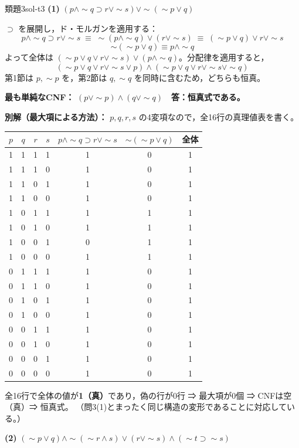 \documentclass[autodetect-engine,dvi=dvipdfmx,ja=standard]{bxjsarticle}
\begin{document}
\begin{solution}{類題3}{sol-t3}
\textbf{(1)} \((p\land\sim q\supset r\lor\sim s)\lor\sim(\sim p\lor q)\)

\(\supset\) を展開し，ド・モルガンを適用する：
\[
  p\land\sim q\supset r\lor\sim s
  \;\equiv\;
  \sim(p\land\sim q)\lor(r\lor\sim s)
  \;\equiv\;
  (\sim p\lor q)\lor r\lor\sim s
\]
\[
  \sim(\sim p\lor q)\equiv p\land\sim q
\]
よって全体は \((\sim p\lor q\lor r\lor\sim s)\lor(p\land\sim q)\)。分配律を適用すると，
\[
  (\sim p\lor q\lor r\lor\sim s\lor p)\land(\sim p\lor q\lor r\lor\sim s\lor\sim q)
\]
第1節は \(p,\sim p\) を，第2節は \(q,\sim q\) を同時に含むため，どちらも恒真。

\textbf{最も単純なCNF：} \((p\lor\sim p)\land(q\lor\sim q)\)　\textbf{答：恒真式である。}

\textbf{別解（最大項による方法）：} \(p,q,r,s\) の4変項なので，全16行の真理値表を書く。

\begin{center}
\scriptsize
\begin{tabular}{cccc|c|c|c}
\toprule
\(p\) & \(q\) & \(r\) & \(s\) & \(p\land\sim q\supset r\lor\sim s\) & \(\sim(\sim p\lor q)\) & 全体 \\
\midrule
1&1&1&1&1&0&1\\
1&1&1&0&1&0&1\\
1&1&0&1&1&0&1\\
1&1&0&0&1&0&1\\
1&0&1&1&1&1&1\\
1&0&1&0&1&1&1\\
1&0&0&1&0&1&1\\
1&0&0&0&1&1&1\\
0&1&1&1&1&0&1\\
0&1&1&0&1&0&1\\
0&1&0&1&1&0&1\\
0&1&0&0&1&0&1\\
0&0&1&1&1&0&1\\
0&0&1&0&1&0&1\\
0&0&0&1&1&0&1\\
0&0&0&0&1&0&1\\
\bottomrule
\end{tabular}
\end{center}

全16行で全体の値が\textbf{1（真）}であり，偽の行が0行 ⇒ 最大項が0個 ⇒ CNFは空（真）⇒ 恒真式。
（問3(1)とまったく同じ構造の変形であることに対応している。）

\textbf{(2)} \((\sim p\lor q)\land\sim(\sim r\land s)\lor(r\lor\sim s)\land(\sim t\supset\sim s)\)


\end{solution}
\end{document}
